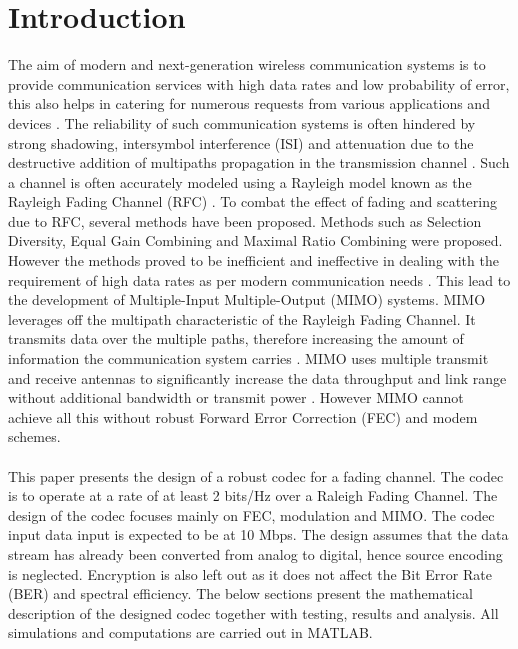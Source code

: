 \documentclass[11pt]{report}
\begin{document}
		
\begin{abstract}
\end{abstract}

\tableofcontents

\newpage

\section{Introduction}
The aim of modern and next-generation wireless communication systems is to provide communication services with high data rates and low probability of error, this also helps in catering for numerous requests from various applications and devices \cite{36,14,49}. The reliability of such communication systems is often hindered by strong shadowing, intersymbol interference (ISI) and attenuation due to the destructive addition of multipaths propagation in the transmission channel \cite{36,32}. Such a channel is often accurately modeled using a Rayleigh model known as the Rayleigh Fading Channel (RFC) \cite{32}. To combat the effect of fading and scattering due to RFC, several methods have been proposed. Methods such as Selection Diversity, Equal Gain Combining and Maximal Ratio Combining were proposed. However the methods proved to be inefficient and ineffective in dealing with the requirement of high data rates as per modern communication needs \cite{B8}. This lead to the development of Multiple-Input Multiple-Output (MIMO) systems. MIMO leverages off the multipath characteristic of the Rayleigh Fading Channel. It transmits data over the multiple paths, therefore increasing the amount of information the communication system carries \cite{50}. MIMO uses multiple transmit and receive antennas to significantly increase the data throughput and link range without additional bandwidth or transmit power \cite{B6}. However MIMO cannot 
achieve all this without robust Forward Error Correction (FEC) and modem schemes. 
\\
\\
This paper presents the design of a robust codec for a fading channel. The codec is to operate at a rate of at least 2 bits/Hz over a Raleigh Fading Channel. The design of the codec focuses mainly on FEC, modulation and MIMO. The codec input data input is expected to be at 10 Mbps. The design assumes that the data stream has already been converted from analog to digital, hence source encoding is neglected. Encryption is also left out as it does not affect the Bit Error Rate (BER) and spectral efficiency. The below sections present the mathematical description of the designed codec together with testing, results and analysis. All simulations and computations are carried out in MATLAB.
\end{document}
